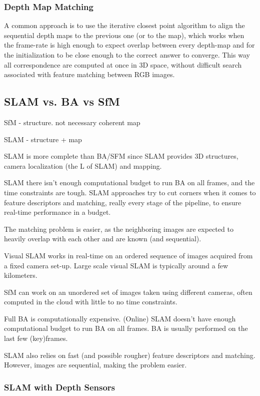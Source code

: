 \subsubsection{Depth Map Matching}
A common approach is to use the iterative closest point algorithm to align the sequential depth maps to the previous one (or to the map), which works when the frame-rate is high enough to expect overlap between every depth-map and for the initialization to be close enough to the correct answer to converge. This way all correspondence are computed at once in 3D space, without difficult search associated with feature matching between RGB images.

\subsection{SLAM vs. BA vs SfM}
SfM - structure. not necessary coherent map

SLAM - structure + map

SLAM is more complete than BA/SFM since SLAM provides 3D structures, camera localization (the L of SLAM) and mapping.

SLAM there isn’t enough computational budget to run BA on all frames, and the time constraints are tough. SLAM approaches try to cut corners when it comes to feature descriptors and matching, really every stage of the pipeline, to ensure real-time performance in a budget. 

The matching problem is easier, as the  neighboring images are expected to heavily overlap with each other and are known (and sequential).

Visual SLAM works in real-time on an ordered sequence of images acquired from a fixed camera set-up. Large scale visual SLAM is typically around a few kilometers.

SfM can work on an unordered set of images taken using different cameras, often computed in the cloud with little to no time constraints.

Full BA is computationally expensive. (Online) SLAM doesn't have enough computational budget to run BA on all frames. BA is usually performed on the last few (key)frames. 

SLAM also relies on fast (and possible rougher) feature descriptors and matching. However, images are sequential, making the problem easier. 

\subsubsection{SLAM with Depth Sensors}

